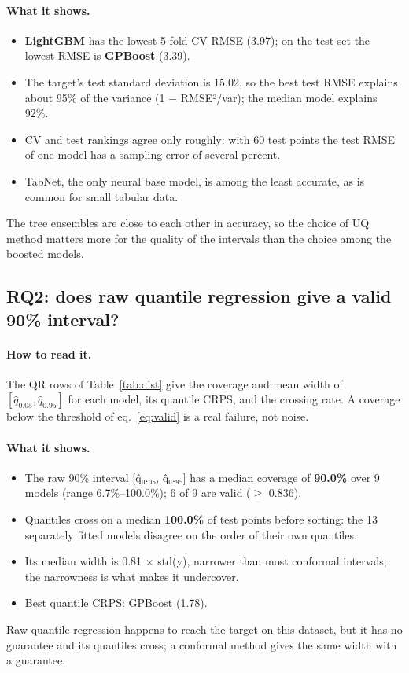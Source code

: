 \documentclass[11pt]{article}
\begin{document}
\paragraph{What it shows.}
\begin{itemize}
\item \textbf{LightGBM} has the lowest 5-fold CV RMSE (3.97); on the test set the lowest RMSE is \textbf{GPBoost} (3.39).
\item The target's test standard deviation is 15.02, so the best test RMSE explains about 95\% of the variance (1 $-$ RMSE²/var); the median model explains 92\%.
\item CV and test rankings agree only roughly: with 60 test points the test RMSE of one model has a sampling error of several percent.
\item TabNet, the only neural base model, is among the least accurate, as is common for small tabular data.
\end{itemize}
\begin{insight}[Takeaway RQ1]
The tree ensembles are close to each other in accuracy, so the choice of UQ method matters more for the quality of the intervals than the choice among the boosted models.
\end{insight}

\subsection{RQ2: does raw quantile regression give a valid 90\% interval?}
\paragraph{How to read it.} The QR rows of Table~\ref{tab:dist} give the coverage and mean width of $[\hat q_{0.05},\hat q_{0.95}]$ for each model, its quantile CRPS, and the crossing rate. A coverage below the threshold of eq.~\eqref{eq:valid} is a real failure, not noise.
\paragraph{What it shows.}
\begin{itemize}
\item The raw 90\% interval [q̂₀.₀₅, q̂₀.₉₅] has a median coverage of \textbf{90.0\%} over 9 models (range 6.7\%--100.0\%); 6 of 9 are valid ($\geq$ 0.836).
\item Quantiles cross on a median \textbf{100.0\%} of test points before sorting: the 13 separately fitted models disagree on the order of their own quantiles.
\item Its median width is 0.81 $\times$ std(y), narrower than most conformal intervals; the narrowness is what makes it undercover.
\item Best quantile CRPS: GPBoost (1.78).
\end{itemize}
\begin{insight}[Takeaway RQ2]
Raw quantile regression happens to reach the target on this dataset, but it has no guarantee and its quantiles cross; a conformal method gives the same width with a guarantee.
\end{insight}
\end{document}
